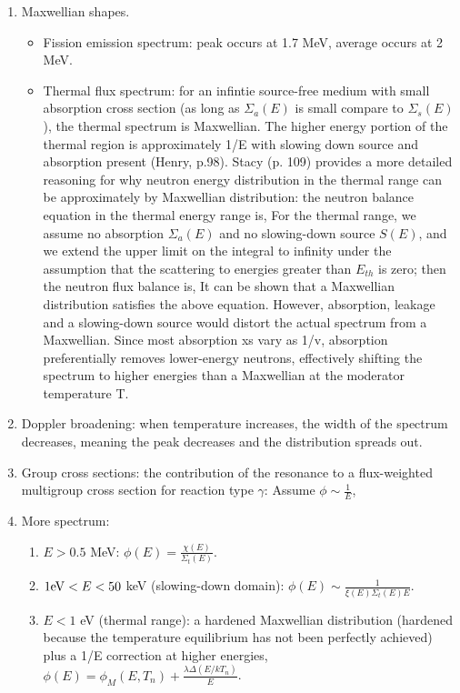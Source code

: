 \documentclass{school-22.211-notes}
\begin{document}
\begin{enumerate}
\item Maxwellian shapes.
  \begin{itemize}
  \item Fission emission spectrum: peak occurs at 1.7 MeV, average occurs at 2 MeV.
  \item Thermal flux spectrum: for an infintie source-free medium with small absorption cross section (as long as $\Sigma_a(E)$ is small compare to $\Sigma_s(E)$), the thermal spectrum is Maxwellian. The higher energy portion of the thermal region is approximately 1/E with slowing down source and absorption present (Henry, p.98). Stacy (p. 109) provides a more detailed reasoning for why neutron energy distribution in the thermal range can be approximately by Maxwellian distribution: the neutron balance equation in the thermal energy range is, 
    For the thermal range, we assume no absorption $\Sigma_a(E)$ and no slowing-down source $S(E)$, and we extend the upper limit on the integral to infinity under the assumption that the scattering to energies greater than $E_{th}$ is zero; then the neutron flux balance is,
   It can be shown that a Maxwellian distribution satisfies the above equation. However, absorption, leakage and a slowing-down source would distort the actual spectrum from a Maxwellian. Since most absorption xs vary as 1/v, absorption preferentially removes lower-energy neutrons, effectively shifting the spectrum to higher energies than a Maxwellian at the moderator temperature T. 
  \end{itemize}

\item Doppler broadening: when temperature increases, the width of the spectrum decreases, meaning the peak decreases and the distribution spreads out. 
  
\item Group cross sections: the contribution of the resonance to a flux-weighted multigroup cross section for reaction type $\gamma$:
  Assume $\phi \sim \frac{1}{E}$,
 
\item More spectrum: 
  \begin{enumerate}
  \item $E > 0.5$ MeV: $\phi(E) = \frac{\chi(E)}{\Sigma_t(E)}$.
  \item $1 \mathrm{eV} < E < 50$ keV (slowing-down domain): $\phi(E) \sim \frac{1}{\xi(E) \Sigma_t(E) E}$. 
  \item $E < 1$ eV (thermal range): a hardened Maxwellian distribution (hardened because the temperature equilibrium has not been perfectly achieved) plus a 1/E correction at higher energies, $\phi(E) = \phi_M (E, T_n) + \frac{ \lambda \Delta (E/kT_n) }{E}$. 
  \end{enumerate}
\end{enumerate}
\end{document}
